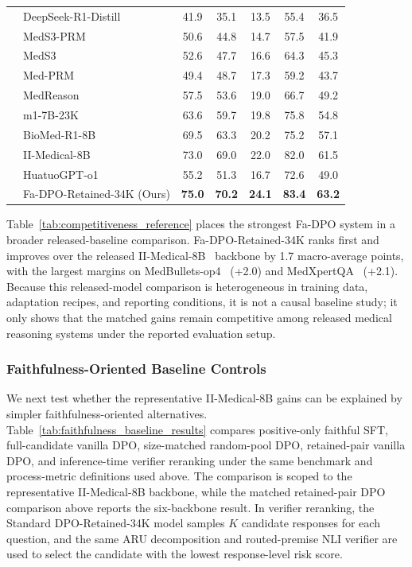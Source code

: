 \documentclass[a4paper,fleqn,doubleblind]{cas-sc}
\begin{document}
\begin{table}[htbp]
{\begin{tabular}{l l c c c c c}
     & DeepSeek-R1-Distill~\cite{deepseek2025r1} & 41.9 & 35.1 & 13.5 & 55.4 & 36.5 \\
     & MedS3-PRM~\cite{jiang2026meds3} & 50.6 & 44.8 & 14.7 & 57.5 & 41.9 \\
     & MedS3~\cite{jiang2026meds3} & 52.6 & 47.7 & 16.6 & 64.3 & 45.3 \\
     & Med-PRM~\cite{yun2025medprm} & 49.4 & 48.7 & 17.3 & 59.2 & 43.7 \\
     & MedReason~\cite{wu2025medreason} & 57.5 & 53.6 & 19.0 & 66.7 & 49.2 \\
     & m1-7B-23K~\cite{huang2025m1} & 63.6 & 59.7 & 19.8 & 75.8 & 54.8 \\
     & BioMed-R1-8B~\cite{thapa2025disentangling} & 69.5 & 63.3 & 20.2 & 75.2 & 57.1 \\
     & II-Medical-8B~\cite{intelligentinternet2025iimedical8b} & 73.0 & 69.0 & 22.0 & 82.0 & 61.5 \\
     & HuatuoGPT-o1~\cite{chen2025huatuogpto1} & 55.2 & 51.3 & 16.7 & 72.6 & 49.0 \\
    & Fa-DPO-Retained-34K (Ours) & \textbf{75.0} & \textbf{70.2} & \textbf{24.1} & \textbf{83.4} & \textbf{63.2} \\
    \bottomrule
    \end{tabular}%
    }
\end{table}

Table~\ref{tab:competitiveness_reference} places the strongest Fa-DPO system in a broader released-baseline comparison. Fa-DPO-Retained-34K ranks first and improves over the released II-Medical-8B~\cite{intelligentinternet2025iimedical8b} backbone by 1.7 macro-average points, with the largest margins on MedBullets-op4~\cite{chen2025benchmarking} (+2.0) and MedXpertQA~\cite{zuo2025medxpertqa} (+2.1). Because this released-model comparison is heterogeneous in training data, adaptation recipes, and reporting conditions, it is not a causal baseline study; it only shows that the matched gains remain competitive among released medical reasoning systems under the reported evaluation setup.

\subsubsection{Faithfulness-Oriented Baseline Controls}
We next test whether the representative II-Medical-8B gains can be explained by simpler faithfulness-oriented alternatives. Table~\ref{tab:faithfulness_baseline_results} compares positive-only faithful SFT, full-candidate vanilla DPO, size-matched random-pool DPO, retained-pair vanilla DPO, and inference-time verifier reranking under the same benchmark and process-metric definitions used above. The comparison is scoped to the representative II-Medical-8B backbone, while the matched retained-pair DPO comparison above reports the six-backbone result. In verifier reranking, the Standard DPO-Retained-34K model samples $K$ candidate responses for each question, and the same ARU decomposition and routed-premise NLI verifier are used to select the candidate with the lowest response-level risk score.
\end{document}

